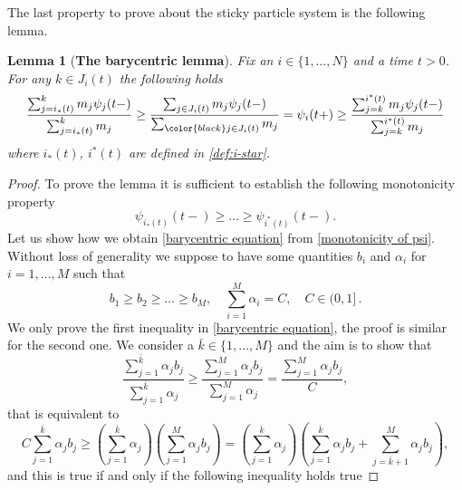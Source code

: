 \documentclass[11pt,a4paper,oneside]{amsart}
\newtheorem{lemma}[definition]{Lemma}
\begin{document}
The last property to prove about the sticky particle system is the following lemma.
\begin{lemma}[\textbf{The barycentric lemma}]\label{lemma: barycentric}
    Fix an $i\in\{1,\dots,N\}$ and a time $t>0$. For any $k\in J_i(t)$ the following holds
    \begin{equation}\label{barycentric equation}
        \frac{\sum_{j=i_*(t)}^km_j\psi_j(t-)}{\sum_{j=i_*(t)}^km_j}\geq
                \frac{\sum_{j\in J_i(t)}m_j\psi_j(t-)} {\sum_
          {{\color{black}j\in J_i(t)}} m_j}=\psi_i(t+)\geq\frac{\sum_{j=k}^{i^*(t)}m_j\psi_j(t-)}{\sum_{j=k}^{i^*(t)}m_j}
    \end{equation}
    {\color{black} where $i_*(t)$, $i^*(t)$ are defined in \eqref{def:i-star}.}
\end{lemma}

\begin{proof}
To prove the lemma it is sufficient to establish the following monotonicity property
    \begin{equation}\label{monotonicity of psi}
        \psi_{i_*(t)}(t-)\geq\dots\geq\psi_{i^*(t)}(t-).
    \end{equation}
     Let us show how we obtain \eqref{barycentric equation} from \eqref{monotonicity of psi}.\newline
    Without loss of generality we suppose to have some quantities $b_i$ and $\alpha_i$ for $i=1,\dots,M$ such that
    \begin{equation}\label{eq:monotonicity_b_i}
       b_1\ge b_2\ge\dots\ge b_M, \quad\sum_{i=1}^M\alpha_i=C,\quad C\in(0,1]\,.
    \end{equation}   
    We only prove the first inequality in \eqref{barycentric equation}, the proof is similar for the second one. 
    We consider a $\bar k\in\{1,\dots,M\}$ and the aim is to show that
    \begin{equation*}
        \frac{\sum_{j=1}^{\bar k}\alpha_jb_j}{\sum_{j=1}^{\bar k}\alpha_j}\geq\frac{\sum_{j=1}^M\alpha_jb_j}
        {\sum_{j=1}^M\alpha_j}=\frac{\sum_{j=1}^M\alpha_jb_j}{C},
    \end{equation*}
    that is equivalent to
    \begin{equation*}
        C\sum_{j=1}^{\bar k}\alpha_jb_j\geq\left(\sum_{j=1}^{\bar k}\alpha_j\right)\left(\sum_{j=1}^M\alpha_jb_j\right)
        =\left(\sum_{j=1}^{\bar k}\alpha_j\right)\left(\sum_{j=1}^{\bar k}\alpha_jb_j+\sum_{j=\bar k+1}^M\alpha_jb_j\right),
    \end{equation*}
    and this is true if and only if the following inequality holds true

\end{proof}
\end{document}
